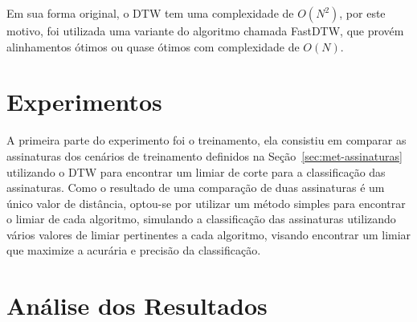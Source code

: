 
Em sua forma original, o DTW tem uma complexidade de $ O(N^{2}) $, por este motivo, foi utilizada uma variante do algoritmo chamada FastDTW, que provém alinhamentos ótimos ou quase ótimos com complexidade de $O(N)$.


\section{Experimentos}
\label{sec:met-Experimentos}

A primeira parte do experimento foi o treinamento, ela consistiu em comparar as assinaturas dos cenários de treinamento definidos na Seção~\ref{sec:met-assinaturas} utilizando o DTW para encontrar um limiar de corte para a classificação das assinaturas. Como o resultado de uma comparação de duas assinaturas é um único valor de distância, optou-se por utilizar um método simples para encontrar o limiar de cada algoritmo, simulando a classificação das assinaturas utilizando vários valores de limiar pertinentes a cada algoritmo, visando encontrar um limiar que maximize a acurária e precisão da classificação.


\section{Análise dos Resultados}
\label{sec:met-analise}






